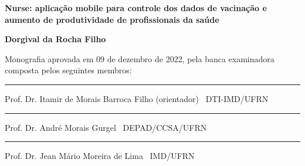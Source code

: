 %
%

\begin{titlepage}

\begin{center}

\LARGE

\textbf{Nurse: aplicação mobile para controle dos dados de vacinação e aumento de produtividade de profissionais da saúde}

\vfill

\Large

\textbf{Dorgival da Rocha Filho}

\end{center}

\vfill

\noindent
Monografia aprovada em 09 de dezembro de 2022, pela banca examinadora composta
pelos seguintes membros:


\begin{center}

\vspace{1.5cm}\rule{0.95\linewidth}{1pt}
\parbox{0.9\linewidth}{%
Prof. Dr. Itamir de Morais Barroca Filho (orientador) \dotfill\ DTI-IMD/UFRN}


\vspace{1.5cm}\rule{0.95\linewidth}{1pt}
\parbox{0.9\linewidth}{%
Prof. Dr. André Morais Gurgel \dotfill\ DEPAD/CCSA/UFRN}

\vspace{1.5cm}\rule{0.95\linewidth}{1pt}
\parbox{0.9\linewidth}{%
Prof. Dr. Jean Mário Moreira de Lima \dotfill\ IMD/UFRN}

\end{center}

\end{titlepage}

%
%

